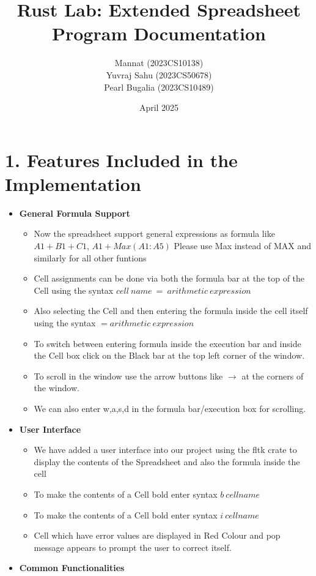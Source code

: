 \documentclass{article}
\title{Rust Lab: Extended Spreadsheet Program Documentation}
\author{Mannat (2023CS10138) \\ Yuvraj Sahu (2023CS50678) \\ Pearl Bugalia (2023CS10489)}
\date{April 2025}
\begin{document}
\maketitle

\section*{1. Features Included in the Implementation}
\begin{itemize}
    \item \textbf{General Formula Support}
    \begin{itemize}
        \item Now the spreadsheet support general expressions as formula like $A1+B1+C1$, $A1+Max(A1:A5)$ {Please use Max instead of MAX and similarly for all other funtions}
        \item Cell assignments can be done via both the formula bar at the top of the Cell using the syntax $cell\ name \ = \ arithmetic \ expression$
        \item Also selecting the Cell and then entering the formula inside the cell itself using the syntax $=arithmetic\ expression$
        \item To switch between entering formula inside the execution bar and inside the Cell box click on the Black bar at the top left corner of the window.
        \item To scroll in the window use the arrow buttons like $\rightarrow$ at the corners of the window.
        \item We can also enter w,a,s,d in the formula bar/execution box for scrolling.
    \end{itemize}
    \item \textbf{User Interface}
    \begin{itemize}
        \item We have added a user interface into our project using the fltk crate to display the contents of the Spreadsheet and also the formula inside the cell
        \item To make the contents of a Cell bold enter syntax $b\ cellname$
        \item To make the contents of a Cell bold enter syntax $i\ cellname$
        \item Cell which have error values are displayed in Red Colour and pop message appears to prompt the user to correct itself.
    \end{itemize}
     \item \textbf{Common Functionalities}

\end{itemize}
\end{document}
